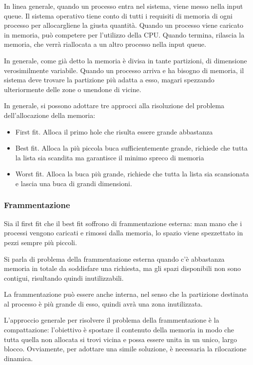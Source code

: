 \documentclass[a4paper]{article}
\begin{document}
In linea generale, quando un processo entra nel sistema, viene messo nella input queue. Il sistema operativo tiene conto di tutti i requisiti di memoria di ogni processo per allocargliene la giusta quantità. Quando un processo viene caricato in memoria, può competere per l'utilizzo della CPU. Quando termina, rilascia la memoria, che verrà riallocata a un altro processo nella input queue.

In generale, come già detto la memoria è divisa in tante partizioni, di dimensione verosimilmente variabile. Quando un processo arriva e ha bisogno di memoria, il sistema deve trovare la partizione più adatta a esso, magari spezzando ulteriormente delle zone o unendone di vicine.

In generale, si possono adottare tre approcci alla risoluzione del problema dell'allocazione della memoria:
\begin{itemize}
    \item First fit. Alloca il primo hole che risulta essere grande abbastanza
    \item Best fit. Alloca la più piccola buca sufficientemente grande, richiede che tutta la lista sia scandita ma garantisce il minimo spreco di memoria
    \item Worst fit. Alloca la buca più grande, richiede che tutta la lista sia scansionata e lascia una buca di grandi dimensioni.
\end{itemize}

\subsubsection{Frammentazione}
Sia il first fit che il best fit soffrono di frammentazione esterna: man mano che i processi vengono caricati e rimossi dalla memoria, lo spazio viene spezzettato in pezzi sempre più piccoli.

Si parla di problema della frammentazione esterna quando c'è abbastanza memoria in totale da soddisfare una richiesta, ma gli spazi disponibili non sono contigui, risultando quindi inutilizzabili.

La frammentazione può essere anche interna, nel senso che la partizione destinata al processo è più grande di esso, quindi avrà una zona inutilizzata.

L'approccio generale per risolvere il problema della frammentazione è la compattazione: l'obiettivo è spostare il contenuto della memoria in modo che tutta quella non allocata si trovi vicina e possa essere unita in un unico, largo blocco. Ovviamente, per adottare una simile soluzione, è necessaria la rilocazione dinamica.
\end{document}
